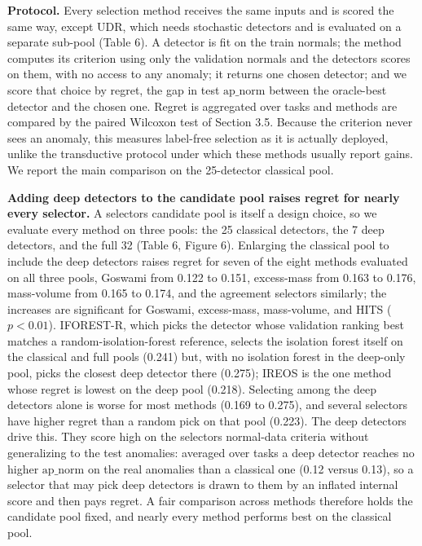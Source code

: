 \documentclass[3p,twocolumn]{elsarticle}
\begin{document}
\textbf{Protocol.} Every selection method receives the same inputs and is scored the same way, except UDR, which needs stochastic detectors and is evaluated on a separate sub-pool (Table 6). A detector is fit on the train normals; the method computes its criterion using only the validation normals and the detectors\textquotesingle{} scores on them, with no access to any anomaly; it returns one chosen detector; and we score that choice by regret, the gap in test \(\mathrm{ap\_norm}\) between the oracle-best detector and the chosen one. Regret is aggregated over tasks and methods are compared by the paired Wilcoxon test of Section 3.5. Because the criterion never sees an anomaly, this measures label-free selection as it is actually deployed, unlike the transductive protocol under which these methods usually report gains. We report the main comparison on the 25-detector classical pool.

\textbf{Adding deep detectors to the candidate pool raises regret for nearly every selector.} A selector\textquotesingle s candidate pool is itself a design choice, so we evaluate every method on three pools: the 25 classical detectors, the 7 deep detectors, and the full 32 (Table 6, Figure 6). Enlarging the classical pool to include the deep detectors raises regret for seven of the eight methods evaluated on all three pools, Goswami from 0.122 to 0.151, excess-mass from 0.163 to 0.176, mass-volume from 0.165 to 0.174, and the agreement selectors similarly; the increases are significant for Goswami, excess-mass, mass-volume, and HITS (\(p<0.01\)). IFOREST-R, which picks the detector whose validation ranking best matches a random-isolation-forest reference, selects the isolation forest itself on the classical and full pools (0.241) but, with no isolation forest in the deep-only pool, picks the closest deep detector there (0.275); IREOS is the one method whose regret is lowest on the deep pool (0.218). Selecting among the deep detectors alone is worse for most methods (0.169 to 0.275), and several selectors have higher regret than a random pick on that pool (0.223). The deep detectors drive this. They score high on the selectors\textquotesingle{} normal-data criteria without generalizing to the test anomalies: averaged over tasks a deep detector reaches no higher \(\mathrm{ap\_norm}\) on the real anomalies than a classical one (0.12 versus 0.13), so a selector that may pick deep detectors is drawn to them by an inflated internal score and then pays regret. A fair comparison across methods therefore holds the candidate pool fixed, and nearly every method performs best on the classical pool.
\end{document}
